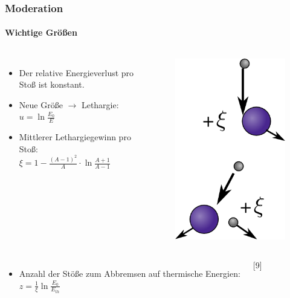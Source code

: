 \documentclass{beamer}[9pt]
\begin{document}
\begin{frame}
\frametitle{Moderation}
\framesubtitle{Wichtige Größen}



\begin{columns}
\begin{itemize}
\item Der relative Energieverlust pro Stoß ist konstant.
\item Neue Größe $\rightarrow$ Lethargie:\\
\vspace{0.5em}
$
u = \ln{\frac {E_0}{ E}}
$
\item Mittlerer Lethargiegewinn pro Stoß:\\
\vspace{0.5em}
$
\xi =1- \frac{(A-1)^2}{A} \cdot \ln{\frac{A+1}{A-1}}
$

\end{itemize}
\begin{figure}

\includegraphics[scale=.3]{moderator.png}

\end{figure}

\end{columns}

\begin{columns}
\begin{itemize}

\item Anzahl der Stöße zum Abbremsen auf thermische Energien:\\\vspace{0.5em}
$
z = \frac{1}{\xi}\ln{\frac{E_0}{E_{th}}}
$
\end{itemize}
\hspace{.5\columnwidth}[9]
\end{columns}
\end{frame}
\end{document}
